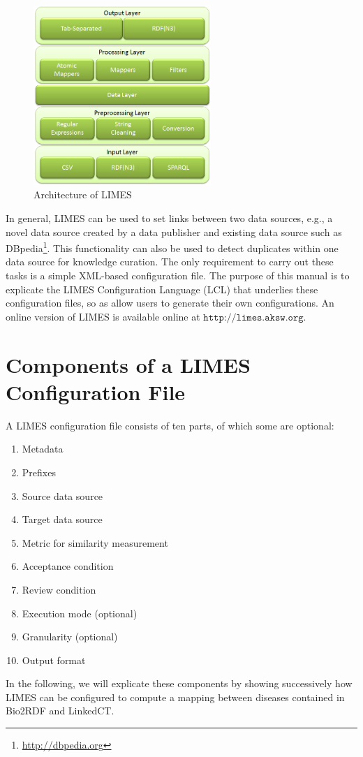 \documentclass[a4paper, 11pt]{article}
\begin{document}
\begin{figure}[ht!]
			\centering
			\includegraphics[width = 0.6\textwidth]{images/architecture.png}
			\caption{Architecture of LIMES}
			\label{fig:architecture}
		\end{figure}
		
In general, LIMES can be used to set links between two data sources, e.g., a novel data source created by a data publisher and existing data source such as DBpedia\footnote{\url{http://dbpedia.org}}. This functionality can also be used to detect duplicates within one data source for knowledge curation. The only requirement to carry out these tasks is a simple XML-based configuration file. The purpose of this manual is to explicate the LIMES Configuration Language (LCL) that underlies these configuration files, so as allow users to generate their own configurations. An online version of LIMES is available online at $\texttt{http://limes.aksw.org}$.

\section{Components of a LIMES Configuration File}
A LIMES configuration file consists of ten parts, of which some are optional:
\begin{enumerate}
\item Metadata
\item Prefixes
\item Source data source
\item Target data source
\item Metric for similarity measurement
\item Acceptance condition
\item Review condition 
\item Execution mode (optional)
\item Granularity (optional)
\item Output format
\end{enumerate}
In the following, we will explicate these components by showing successively how LIMES can be configured to compute a mapping between diseases contained in Bio2RDF and LinkedCT.
\end{document}
